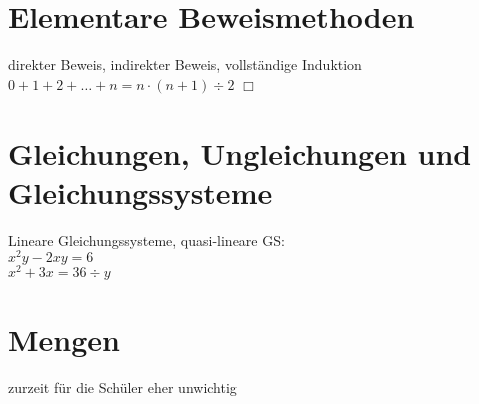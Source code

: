 \documentclass[a4paper]{article}
\theoremstyle{nonumberplain}
\begin{document}
\part{Elementare Beweismethoden}

direkter Beweis, indirekter Beweis, vollständige Induktion\\
$0+1+2+ \dots + n = n \cdot (n+1) \div 2$
$\Box$

\part{Gleichungen, Ungleichungen und Gleichungssysteme}

Lineare Gleichungssysteme, quasi-lineare GS:\\
$x^2 y - 2xy = 6$\\
$x^2 + 3 x = 36 \div y$

\part{Mengen}
zurzeit für die Schüler eher unwichtig
\end{document}
